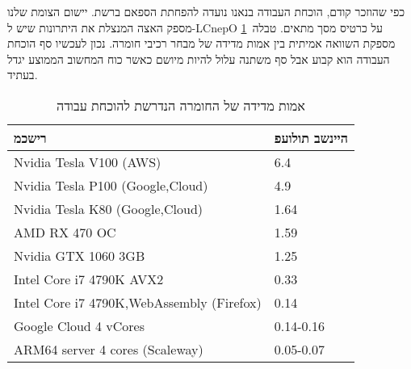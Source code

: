 
כפי שהוזכר קודם, הוכחת העבודה בנאנו נועדה להפחתת הספאם ברשת. יישום הצומת שלנו מספק האצה  המנצלת את היתרונות שיש ל-LCnepO 
על כרטיס מסך מתאים.
 טבלה~\ref{table:hardware_pow}
 מספקת השוואה אמיתית בין אמות מדידה של מבחר רכיבי חומרה. נכון לעכשיו סף הוכחת העבודה הוא קבוע אבל סף משתנה עלול להיות מיושם כאשר כוח המחשוב הממוצע יגדל בעתיד.
 


\begin{table}[!ht]
\centering
\caption{אמות מדידה של החומרה הנדרשת להוכחת עבודה}
\label{table:hardware_pow}
\begin{tabular}{ll}
רישכמ                                    &היינשב תולועפ   \\
\hline
Nvidia Tesla V100 (AWS)                   & 6.4                     \\
Nvidia Tesla P100 (Google,Cloud)          & 4.9                     \\
Nvidia Tesla K80 (Google,Cloud)           & 1.64                    \\
AMD RX 470 OC                             & 1.59                    \\
Nvidia GTX 1060 3GB                       & 1.25                    \\
Intel Core i7 4790K AVX2                  & 0.33                    \\
Intel Core i7 4790K,WebAssembly (Firefox) & 0.14                    \\
Google Cloud 4 vCores                     & 0.14-0.16               \\
ARM64 server 4 cores (Scaleway)           & 0.05-0.07               \\
\end{tabular}
\end{table}